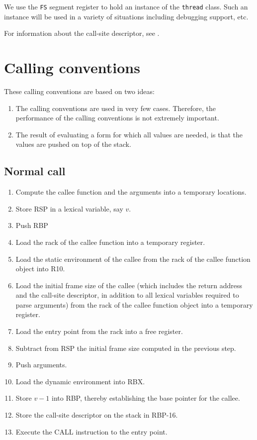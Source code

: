 We use the \texttt{FS} segment register to hold an instance of the
\texttt{thread} class.  Such an instance will be used in a variety of
situations including debugging support, etc.

For information about the call-site descriptor, see
.


\section{Calling conventions}

These calling conventions are based on two ideas:

\begin{enumerate}
\item The calling conventions are used in very few cases.  Therefore,
  the performance of the calling conventions is not extremely
  important.
\item The result of evaluating a form for which all values are needed,
  is that the values are pushed on top of the stack.
\end{enumerate}

\subsection{Normal call}

\begin{enumerate}
\item Compute the callee function and the arguments into a temporary
  locations.
\item Store RSP in a lexical variable, say $v$.
\item Push RBP
\item Load the rack of the callee function into a temporary register.
\item Load the static environment of the callee from the rack of the
  callee function object into R10.
\item Load the initial frame size of the callee (which
  includes the return address and the call-site descriptor, in
  addition to all lexical variables required to parse arguments) from
  the rack of the callee function object into a temporary register.
\item Load the entry point from the rack into a free register.
\item Subtract from RSP the initial frame size computed in the
  previous step.
\item Push arguments.
\item Load the dynamic environment into RBX.
\item Store $v-1$ into RBP, thereby establishing the base pointer
  for the callee.
\item Store the call-site descriptor on the stack in RBP-16.
\item Execute the CALL instruction to the entry point.
\end{enumerate}

